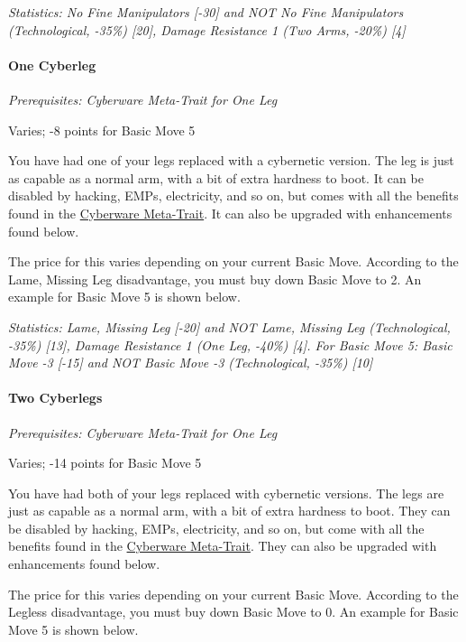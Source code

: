 \begin{multicols*}{3}
	\textit{\textcolor{OliveGreen}{Statistics:  No Fine Manipulators [-30] and NOT No Fine Manipulators (Technological, -35\%) [20], Damage Resistance 1 (Two Arms, -20\%) [4]}}
			
	\paragraph{One Cyberleg}
	\textit{Prerequisites:  Cyberware Meta-Trait for One Leg}
	\begin{flushright}
		Varies; -8 points for Basic Move 5
	\end{flushright}
	
	You have had one of your legs replaced with a cybernetic version. The leg is just as capable as a normal arm, with a bit of extra hardness to boot. It can be disabled by hacking, EMPs, electricity, and so on, but comes with all the benefits found in the \hyperref[cyberware-meta-trait]{Cyberware Meta-Trait}. It can also be upgraded with enhancements found below.
	
	The price for this varies depending on your current Basic Move. According to the Lame, Missing Leg disadvantage, you must buy down Basic Move to 2. An example for Basic Move 5 is shown below.	
	
	\textit{\textcolor{OliveGreen}{Statistics:  Lame, Missing Leg [-20] and NOT Lame, Missing Leg (Technological, -35\%) [13], Damage Resistance 1 (One Leg, -40\%) [4]. For Basic Move 5: Basic Move -3 [-15] and NOT Basic Move -3 (Technological, -35\%) [10]}}
	
	\paragraph{Two Cyberlegs}
	\textit{Prerequisites:  Cyberware Meta-Trait for One Leg}
	\begin{flushright}
		Varies; -14 points for Basic Move 5
	\end{flushright}

	You have had both of your legs replaced with cybernetic versions. The legs are just as capable as a normal arm, with a bit of extra hardness to boot. They can be disabled by hacking, EMPs, electricity, and so on, but come with all the benefits found in the \hyperref[cyberware-meta-trait]{Cyberware Meta-Trait}. They can also be upgraded with enhancements found below.
	
	The price for this varies depending on your current Basic Move. According to the Legless disadvantage, you must buy down Basic Move to 0. An example for Basic Move 5 is shown below.
	

\end{multicols*}
